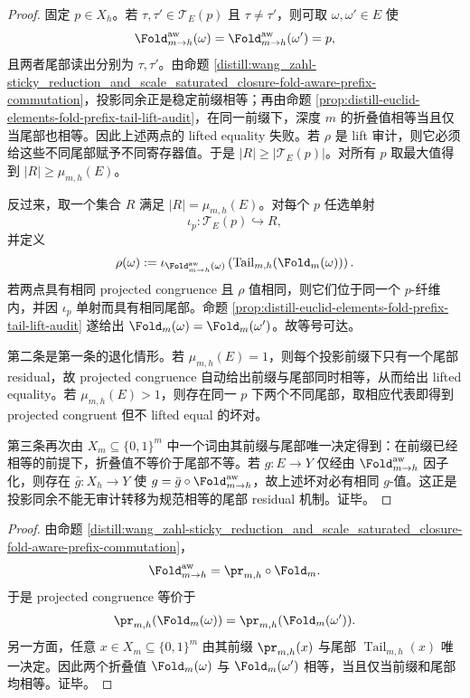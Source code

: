 \begin{proof}
固定 \(p\in X_h\)。若 \(\tau,\tau'\in\mathcal T_E(p)\) 且 \(\tau\ne\tau'\)，则可取
\(\omega,\omega'\in E\) 使
\[
\Fold^{\rm aw}_{m\to h}(\omega)=
\Fold^{\rm aw}_{m\to h}(\omega')=p,
\]
且两者尾部读出分别为 \(\tau,\tau'\)。由命题
\ref{distill:wang_zahl-sticky_reduction_and_scale_saturated_closure-fold-aware-prefix-commutation}，投影同余正是稳定前缀相等；再由命题
\ref{prop:distill-euclid-elements-fold-prefix-tail-lift-audit}，在同一前缀下，深度 \(m\) 的折叠值相等当且仅当尾部也相等。因此上述两点的 lifted equality 失败。若 \(\rho\) 是 lift 审计，则它必须给这些不同尾部赋予不同寄存器值。于是
\(|R|\ge |\mathcal T_E(p)|\)。对所有 \(p\) 取最大值得到
\(|R|\ge\mu_{m,h}(E)\)。

反过来，取一个集合 \(R\) 满足 \(|R|=\mu_{m,h}(E)\)。对每个 \(p\) 任选单射
\[
\iota_p:\mathcal T_E(p)\hookrightarrow R,
\]
并定义
\[
\rho(\omega):=\iota_{\Fold^{\rm aw}_{m\to h}(\omega)}
\left(
\operatorname{Tail}_{m,h}(\Fold_m(\omega))
\right).
\]
若两点具有相同 projected congruence 且 \(\rho\) 值相同，则它们位于同一个 \(p\)-纤维内，并因 \(\iota_p\) 单射而具有相同尾部。命题
\ref{prop:distill-euclid-elements-fold-prefix-tail-lift-audit} 遂给出 \(\Fold_m(\omega)=\Fold_m(\omega')\)。故等号可达。

第二条是第一条的退化情形。若 \(\mu_{m,h}(E)=1\)，则每个投影前缀下只有一个尾部 residual，故 projected congruence 自动给出前缀与尾部同时相等，从而给出 lifted equality。若 \(\mu_{m,h}(E)>1\)，则存在同一 \(p\) 下两个不同尾部，取相应代表即得到 projected congruent 但不 lifted equal 的坏对。

第三条再次由 \(X_m\subseteq\{0,1\}^m\) 中一个词由其前缀与尾部唯一决定得到：在前缀已经相等的前提下，折叠值不等价于尾部不等。若 \(g:E\to Y\) 仅经由 \(\Fold^{\rm aw}_{m\to h}\) 因子化，则存在 \(\bar g:X_h\to Y\) 使
\(g=\bar g\circ\Fold^{\rm aw}_{m\to h}\)，故上述坏对必有相同 \(g\)-值。这正是投影同余不能无审计转移为规范相等的尾部 residual 机制。证毕。
\end{proof}

\begin{proof}
由命题 \ref{distill:wang_zahl-sticky_reduction_and_scale_saturated_closure-fold-aware-prefix-commutation}，
\[
\Fold^{\rm aw}_{m\to h}=\pr_{m,h}\circ\Fold_m.
\]
于是 projected congruence 等价于
\[
\pr_{m,h}(\Fold_m(\omega))=\pr_{m,h}(\Fold_m(\omega')).
\]
另一方面，任意 \(x\in X_m\subseteq\{0,1\}^m\) 由其前缀 \(\pr_{m,h}(x)\) 与尾部 \(\operatorname{Tail}_{m,h}(x)\) 唯一决定。因此两个折叠值 \(\Fold_m(\omega)\) 与 \(\Fold_m(\omega')\) 相等，当且仅当前缀和尾部均相等。证毕。
\end{proof}

